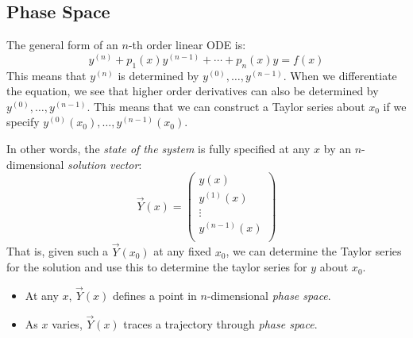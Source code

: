 \documentclass[../main.tex]{subfiles}
\begin{document}
\subsection{Phase Space}
\label{phaseSpaceSec}
The general form of an $n$-th order linear ODE is:
\[
  y^{(n)} + p_1(x)y^{(n-1)} + \cdots + p_n(x)y = f(x)
\]
This means that $y^{(n)}$ is determined by $y^{(0)}, \ldots, y^{(n-1)}$.
When we differentiate the equation, we see that higher order derivatives can also be determined by $y^{(0)}, \ldots, y^{(n-1)}$.
This means that we can construct a Taylor series about $x_0$ if we specify $y^{(0)}(x_0), \ldots, y^{(n-1)}(x_0)$.

In other words, the \textit{state of the system} is fully specified at any $x$ by an $n$-dimensional \textit{solution vector}:
\[
  \vec{Y}(x) = \begin{pmatrix}
  y(x) \\
  y^{(1)}(x) \\
  \vdots \\
  y^{(n-1)}(x) \\
  \end{pmatrix}
\]
That is, given such a $\vec{Y}(x_0)$ at any fixed $x_0$, we can determine the Taylor series for the solution and use this to determine the taylor series for $y$ about $x_0$.
\begin{remark}
  \begin{itemize}
    \item At any $x$, $\vec{Y}(x)$ defines a point in $n$-dimensional \textit{phase space}.
    \item As $x$ varies, $\vec{Y}(x)$ traces a trajectory through \textit{phase space}.
  \end{itemize}
\end{remark}
\end{document}
